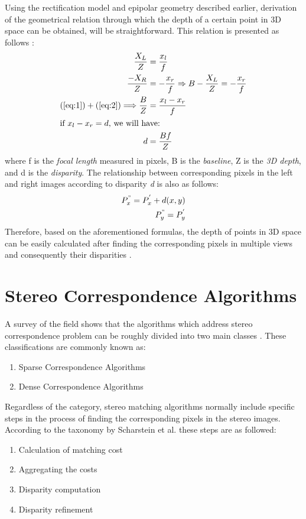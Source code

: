 Using the rectification model and epipolar geometry described earlier, 
derivation of the geometrical relation through which the depth of a certain point in 3D space 
can be obtained, will be straightforward. This relation is presented as follows \cite{sze11}:
\begin{align}
\frac{X_{L}}{Z} &= \frac{x_{l}}{f} \label{eq:1} \\
\frac{-X_{R}}{Z} &= -\frac{x_{r}}{f}  \Rightarrow B-\frac{X_{L}}{Z}=-\frac{x_{r}}{f} \label{eq:2} \\
(\ref{eq:1}) + (\ref{eq:2}) \Longrightarrow  \frac{B}{Z} &= \frac{x_{l}-x_{r}}{f} \label{eq:3} \\
\intertext{if $x_{l}-x_{r}=d$, we will have:}
d &= \frac{Bf}{Z} \label{eq:dispeq}
\end{align}
where f is the {\it focal length} measured in pixels, B is the {\it baseline}, Z is the {\it 3D depth}, and d is the {\it disparity}. The relationship between corresponding pixels in the left
and right images according to disparity {\it d} is also as follows:
\begin{align}
{P}^{"}_{x}={P}^{'}_{x}+d(x,y) \\
{P}^{"}_{y} = {P}^{'}_{y}
\end{align}
Therefore, based on the aforementioned formulas, the depth of points in 3D space can be easily calculated after finding the corresponding pixels in multiple views and consequently their
disparities \cite{bol87,oku93,sch02}.

\section{Stereo Correspondence Algorithms}
A survey of the field shows that the algorithms which address stereo correspondence problem can be roughly divided into two main classes \cite{sch02}. These classifications are commonly known as:
\begin{enumerate}
\item Sparse Correspondence Algorithms
\item Dense Correspondence Algorithms 
\end{enumerate}

Regardless of the category, stereo matching algorithms normally include specific steps in the process of finding the corresponding pixels in the stereo images.
According to the taxonomy by Scharstein et al. these steps are as followed:

\begin{enumerate}
\item {Calculation of matching cost}
\item {Aggregating the costs}
\item {Disparity computation}
\item {Disparity refinement}
\end{enumerate}

